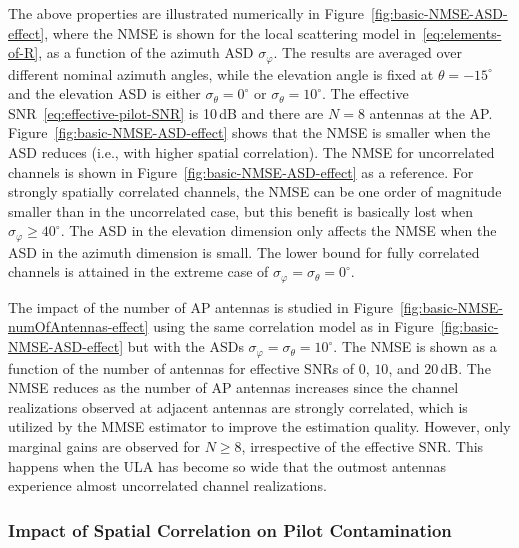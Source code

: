 The above properties are illustrated numerically in Figure~\ref{fig:basic-NMSE-ASD-effect}, where the \gls{NMSE} is shown for the local scattering model in~\eqref{eq:elements-of-R}, as a function of the azimuth \gls{ASD} $\sigma_{\varphi}$. The results are averaged over different nominal azimuth angles, while the elevation angle is fixed at $\theta = -15^\circ$ and the elevation ASD is either $\sigma_{\theta} = 0^\circ$ or $\sigma_{\theta} = 10^\circ$.
The effective \gls{SNR}~\eqref{eq:effective-pilot-SNR} is 10\,dB and there are $N=8$ antennas at the AP. Figure~\ref{fig:basic-NMSE-ASD-effect} shows that the NMSE is smaller when the \gls{ASD} reduces (i.e., with higher spatial correlation). The \gls{NMSE} for uncorrelated channels is shown in Figure~\ref{fig:basic-NMSE-ASD-effect} as a reference.  For strongly spatially correlated channels, the NMSE can be one order of magnitude smaller than in the uncorrelated case, but this benefit is basically lost when $\sigma_{\varphi}\ge 40^\circ$.
The ASD in the elevation dimension only affects the NMSE when the ASD in the azimuth dimension is small. The lower bound for fully correlated channels is attained in the extreme case of $\sigma_{\varphi}=\sigma_{\theta} = 0^\circ$.

\enlargethispage{\baselineskip}

The impact of the number of AP antennas is studied in Figure~\ref{fig:basic-NMSE-numOfAntennas-effect} using the same correlation model as in Figure~\ref{fig:basic-NMSE-ASD-effect} but with the ASDs $\sigma_{\varphi}=\sigma_{\theta}=10^\circ$. The NMSE is shown as a function of the number of antennas for effective SNRs of $0$, $10$, and $20$\,dB. The NMSE reduces as the number of AP antennas increases since the channel realizations observed at adjacent antennas are strongly correlated, which is utilized by the MMSE estimator to improve the estimation quality.
However, only marginal gains are observed for $N\ge 8$, irrespective of the effective SNR. 
This happens when the ULA has become so wide that the outmost antennas experience almost uncorrelated channel realizations.


\subsubsection{Impact of Spatial Correlation on Pilot Contamination}

